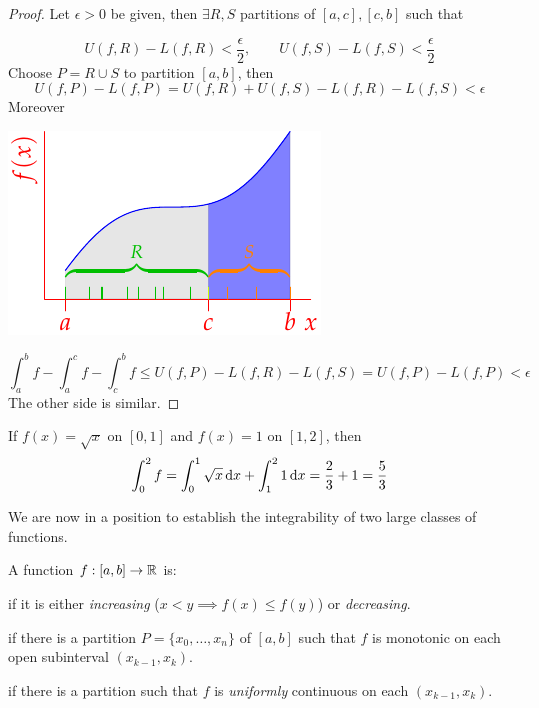 \begin{proof}
Let $\epsilon>0$ be given, then $\exists R,S$ partitions of $[a,c],[c,b]$ such that\par
\begin{minipage}[t]{0.65\linewidth}\vspace{-10pt}
\[U(f,R)-L(f,R)<\frac\epsilon 2,\qquad U(f,S)-L(f,S)<\frac\epsilon 2\]
Choose $P=R\cup S$ to partition $[a,b]$, then
\[U(f,P)-L(f,P)=U(f,R)+U(f,S)-L(f,R)-L(f,S)<\epsilon\]
Moreover
\end{minipage}\begin{minipage}[t]{0.35\linewidth}\vspace{0pt}
\flushright\includegraphics{domain-split2}
\end{minipage}\par
\[\int_a^bf-\int_a^cf-\int_c^bf\le U(f,P)-L(f,R)-L(f,S)=U(f,P)-L(f,P)<\epsilon\]
The other side is similar.
\end{proof}

\goodbreak

\begin{example}{}{}
If $f(x)=\sqrt x$ on $[0,1]$ and $f(x)=1$ on $[1,2]$, then
\[\int_0^2f=\int_0^1\sqrt x\,{\mathrm{d} x}+\int_1^2 1\,{\mathrm{d} x}=\frac 23+1=\frac 53\]
\end{example}



We are now in a position to establish the integrability of two large classes of functions.

\begin{defn}{}{}
A function $f:[a,b]\to\mathbb{R}$ is:
\begin{description}\itemsep3pt
	\item[\normalfont\emph{Monotonic}] if it is either \emph{increasing} ($x<y\implies f(x)\le f(y)$) or \emph{decreasing}.
	\item[\normalfont\emph{Piecewise monotonic}] if there is a partition $P=\{x_0,\ldots,x_n\}$ of $[a,b]$ such that $f$ is monotonic on each open subinterval $(x_{k-1},x_k)$.
	\item[\normalfont\emph{Piecewise continuous}] if there is a partition such that $f$ is \emph{uniformly} continuous on each $(x_{k-1},x_k)$.
\end{description}
\end{defn}

